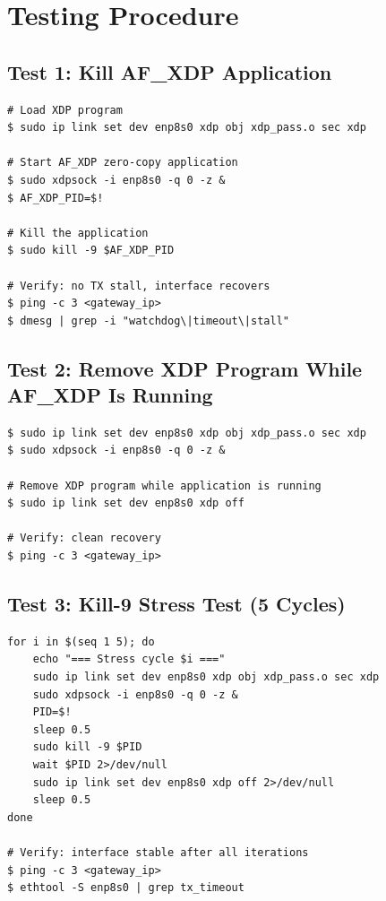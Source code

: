 \documentclass[11pt,a4paper,openany]{book}
\begin{document}
\section{Testing Procedure}

\subsection{Test 1: Kill AF\_XDP Application}

\begin{lstlisting}[style=shellstyle]
# Load XDP program
$ sudo ip link set dev enp8s0 xdp obj xdp_pass.o sec xdp

# Start AF_XDP zero-copy application
$ sudo xdpsock -i enp8s0 -q 0 -z &
$ AF_XDP_PID=$!

# Kill the application
$ sudo kill -9 $AF_XDP_PID

# Verify: no TX stall, interface recovers
$ ping -c 3 <gateway_ip>
$ dmesg | grep -i "watchdog\|timeout\|stall"
\end{lstlisting}

\subsection{Test 2: Remove XDP Program While AF\_XDP Is Running}

\begin{lstlisting}[style=shellstyle]
$ sudo ip link set dev enp8s0 xdp obj xdp_pass.o sec xdp
$ sudo xdpsock -i enp8s0 -q 0 -z &

# Remove XDP program while application is running
$ sudo ip link set dev enp8s0 xdp off

# Verify: clean recovery
$ ping -c 3 <gateway_ip>
\end{lstlisting}

\subsection{Test 3: Kill-9 Stress Test (5 Cycles)}

\begin{lstlisting}[style=shellstyle]
for i in $(seq 1 5); do
    echo "=== Stress cycle $i ==="
    sudo ip link set dev enp8s0 xdp obj xdp_pass.o sec xdp
    sudo xdpsock -i enp8s0 -q 0 -z &
    PID=$!
    sleep 0.5
    sudo kill -9 $PID
    wait $PID 2>/dev/null
    sudo ip link set dev enp8s0 xdp off 2>/dev/null
    sleep 0.5
done

# Verify: interface stable after all iterations
$ ping -c 3 <gateway_ip>
$ ethtool -S enp8s0 | grep tx_timeout
\end{lstlisting}
\end{document}
